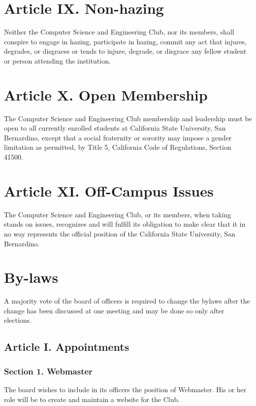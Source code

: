 \documentclass{article}
\begin{document}
\section{Article IX. Non-hazing}
  Neither the Computer Science and Engineering Club, nor its members, shall conspire to engage in hazing, participate in hazing, commit any act that injures, degrades, or disgraces or tends to injure, degrade, or disgrace any fellow student or person attending the institution.

\section{Article X. Open Membership}
  The Computer Science and Engineering Club membership and leadership must be open to all currently enrolled students at California State University, San Bernardino, except that a social fraternity or sorority may impose a gender limitation as permitted, by Title 5, California Code of Regulations, Section 41500.

\section{Article XI. Off-Campus Issues}
  The Computer Science and Engineering Club, or its members, when taking stands on issues, recognizes and will fulfill its obligation to make clear that it in no way represents the official position of the California State University, San Bernardino.

\newpage
\section{By-laws}
  A majority vote of the board of officers is required to change the bylaws after the change has been discussed at one meeting and may be done so only after elections.

  \subsection{Article I. Appointments}

    \subsubsection{Section 1. Webmaster}
      The board wishes to include in its officers the position of Webmaster. His or her role will be to create and maintain a website for the Club.
\end{document}
